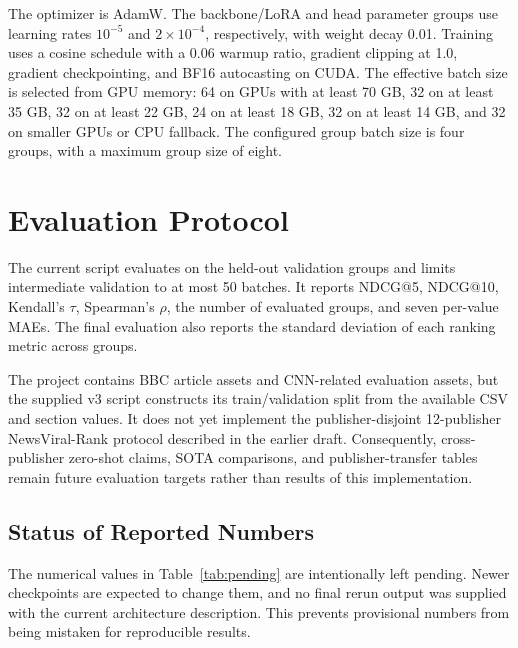 \documentclass[11pt]{article}
\begin{document}
The optimizer is AdamW. The backbone/LoRA and head parameter groups use learning rates $10^{-5}$ and $2\times10^{-4}$, respectively, with weight decay 0.01. Training uses a cosine schedule with a 0.06 warmup ratio, gradient clipping at 1.0, gradient checkpointing, and BF16 autocasting on CUDA. The effective batch size is selected from GPU memory: 64 on GPUs with at least 70 GB, 32 on at least 35 GB, 32 on at least 22 GB, 24 on at least 18 GB, 32 on at least 14 GB, and 32 on smaller GPUs or CPU fallback. The configured group batch size is four groups, with a maximum group size of eight.

\section{Evaluation Protocol}

The current script evaluates on the held-out validation groups and limits intermediate validation to at most 50 batches. It reports NDCG@5, NDCG@10, Kendall's $\tau$, Spearman's $\rho$, the number of evaluated groups, and seven per-value MAEs. The final evaluation also reports the standard deviation of each ranking metric across groups.

The project contains BBC article assets and CNN-related evaluation assets, but the supplied v3 script constructs its train/validation split from the available CSV and section values. It does not yet implement the publisher-disjoint 12-publisher NewsViral-Rank protocol described in the earlier draft. Consequently, cross-publisher zero-shot claims, SOTA comparisons, and publisher-transfer tables remain future evaluation targets rather than results of this implementation.

\subsection{Status of Reported Numbers}

The numerical values in Table~\ref{tab:pending} are intentionally left pending. Newer checkpoints are expected to change them, and no final rerun output was supplied with the current architecture description. This prevents provisional numbers from being mistaken for reproducible results.
\end{document}
